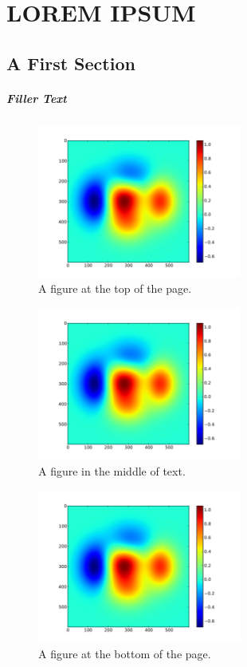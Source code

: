 \chapter{LOREM IPSUM}

\section*{A First Section}

\paragraph{Filler Text} \lipsum[1-6]
%
\begin{figure}[t]
  \centering
  \includegraphics[width=0.6\textwidth]{Chapter-2/figs/color}
  \caption{A figure at the top of the page.}
  \label{fig:ch3.1}
\end{figure}
%
\lipsum[7-13]
%
\begin{figure}[!h]
  \centering
  \includegraphics[width=0.6\textwidth]{Chapter-2/figs/color}
  \caption{A figure in the middle of text.}
  \label{fig:ch3.2}
\end{figure}
%
\begin{figure}[!b]
  \centering
  \includegraphics[width=0.6\textwidth]{Chapter-2/figs/color}
  \caption{A figure at the bottom of the page.}
  \label{fig:ch3.3}
\end{figure}
%
\lipsum[14-20]
